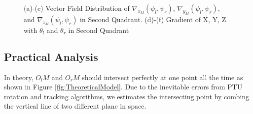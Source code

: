 \documentclass[journal,article,submit,moreauthors,pdftex,10pt,a4paper]{mdpi}
\begin{document}
\begin{figure}[!tb]
{	}	
	\caption{(a)-(c) Vector Field Distribution of $\nabla_{x_M}(\psi_l, \psi_r)$, $\nabla_{y_M}(\psi_l, \psi_r)$, and $\nabla_{z_M}(\psi_l, \psi_r)$ in Second Quadrant. (d)-(f) Gradient of X, Y, Z with $\theta_l$ and  $\theta_r$ in Second Quadrant}
\end{figure}

%
\subsection{Practical Analysis}
In theory, $O_lM$ and $O_rM$ should intersect perfectly at one point all the time as shown in Figure  \ref{fig:TheoreticalModel}. Due to the inevitable errors from PTU rotation and tracking algorithms, we estimates the intersecting point by combing the vertical line of two different plane in space.
\end{document}
